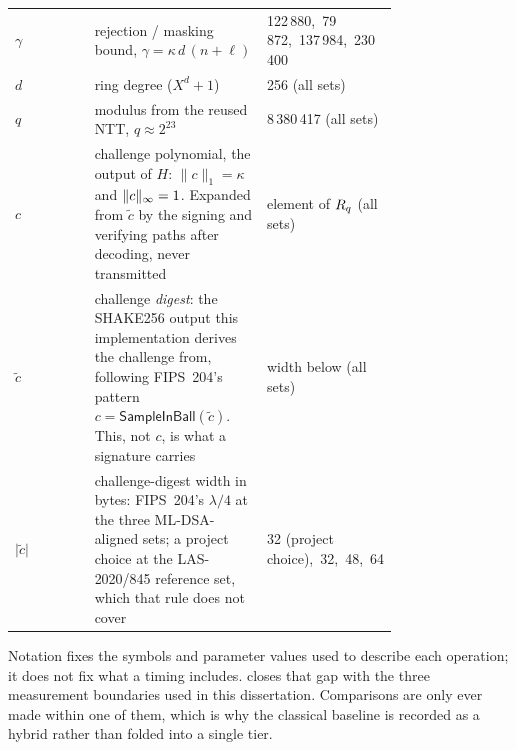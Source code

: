 \begin{longtable}{@{}l L{0.45\linewidth} L{0.31\linewidth}@{}}
    $\gamma$   & rejection / masking bound, $\gamma=\kappa\,d\,(n+\ell)$            & 122\,880,\ 79\,872,\ 137\,984,\ 230\,400 \\
    $d$        & ring degree ($X^{d}+1$)                                            & 256 (all sets) \\
    $q$        & modulus from the reused NTT, $q\approx 2^{23}$                     & 8\,380\,417 (all sets) \\
    $c$        & challenge polynomial, the output of $H$: $\lVert c\rVert_1=\kappa$ and
                 $\lVert c \rVert_\infty=1$. Expanded from $\tilde c$ by the signing and
                 verifying paths after decoding, never transmitted
               & element of $R_q$ (all sets) \\
    $\tilde c$ & challenge \emph{digest}: the SHAKE256 output this implementation derives
                 the challenge from, following FIPS~204's pattern
                 $c=\textsf{SampleInBall}(\tilde c)$. This, not $c$, is what a signature
                 carries
               & width below (all sets) \\
    $\lvert\tilde c\rvert$
               & challenge-digest width in bytes: FIPS~204's $\lambda/4$ at the three
                 ML-DSA-aligned sets; a project choice at the LAS-2020/845 reference set,
                 which that rule does not cover
               & 32 (project choice),\ 32,\ 48,\ 64 \\
\end{longtable}
\endgroup

Notation fixes the symbols and parameter values used to describe each operation; it
does not fix what a timing includes.  closes that gap with the three
measurement boundaries used in this dissertation. Comparisons are only ever made
within one of them, which is why the classical baseline is recorded as a hybrid rather
than folded into a single tier.

